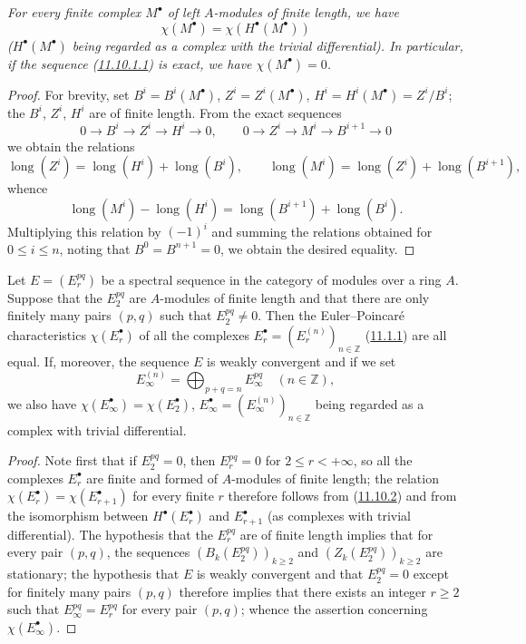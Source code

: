 \begin{proposition}[11.10.2]
\label{0.11.10.2}
\emph{For every finite complex $M^\bullet$ of left $A$-modules of finite
length, we have
\[
\chi(M^\bullet)=\chi(H^\bullet(M^\bullet))
\]
($H^\bullet(M^\bullet)$ being regarded as a complex with the trivial
differential). In particular, if the sequence
(\hyperref[0.11.10.1.1]{11.10.1.1}) is exact, we have
$\chi(M^\bullet)=0$.}
\end{proposition}

\begin{proof}
For brevity, set $B^i=B^i(M^\bullet)$, $Z^i=Z^i(M^\bullet)$,
$H^i=H^i(M^\bullet)=Z^i/B^i$; the $B^i$, $Z^i$, $H^i$ are of finite
length. From the exact sequences
\[
0\longrightarrow B^i\longrightarrow Z^i\longrightarrow H^i
\longrightarrow0,
\qquad
0\longrightarrow Z^i\longrightarrow M^i\longrightarrow B^{i+1}
\longrightarrow0
\]
we obtain the relations
\[
\operatorname{long}(Z^i)=\operatorname{long}(H^i)+
\operatorname{long}(B^i),
\qquad
\operatorname{long}(M^i)=\operatorname{long}(Z^i)+
\operatorname{long}(B^{i+1}),
\]
whence
\[
\operatorname{long}(M^i)-\operatorname{long}(H^i)=
\operatorname{long}(B^{i+1})+\operatorname{long}(B^i).
\]
Multiplying this relation by $(-1)^i$ and summing the relations
obtained for $0\leq i\leq n$, noting that
$B^0=B^{n+1}=0$, we obtain the desired equality.
\end{proof}

\begin{corollary}[11.10.3]
\label{0.11.10.3}
Let $E=(E_r^{pq})$ be a spectral sequence in the category of modules over a
ring $A$. Suppose that the $E_2^{pq}$ are $A$-modules of finite
length and that there are only finitely many pairs $(p,q)$ such that
$E_2^{pq}\neq0$. Then the Euler--Poincaré characteristics
$\chi(E_r^\bullet)$ of all the complexes
$E_r^\bullet=(E_r^{(n)})_{n\in\mathbb Z}$
(\hyperref[0.11.1.1]{11.1.1}) are all equal. If, moreover, the sequence
$E$ is weakly convergent and if we set
\[
E_\infty^{(n)}=\bigoplus_{p+q=n}E_\infty^{pq}\quad(n\in\mathbb Z),
\]
we also have $\chi(E_\infty^\bullet)=\chi(E_2^\bullet)$,
$E_\infty^\bullet=(E_\infty^{(n)})_{n\in\mathbb Z}$ being regarded as
a complex with trivial differential.
\end{corollary}

\begin{proof}
Note first that if $E_2^{pq}=0$, then $E_r^{pq}=0$ for
$2\leq r<+\infty$, so all the complexes $E_r^\bullet$ are finite and
formed of $A$-modules of finite length; the relation
$\chi(E_r^\bullet)=\chi(E_{r+1}^\bullet)$ for every finite $r$ therefore
follows from (\hyperref[0.11.10.2]{11.10.2}) and from the isomorphism
between $H^\bullet(E_r^\bullet)$ and $E_{r+1}^\bullet$ (as complexes with
trivial differential). The hypothesis that the $E_r^{pq}$ are of finite length
implies that for every pair $(p,q)$, the sequences
$(B_k(E_2^{pq}))_{k\geq2}$ and $(Z_k(E_2^{pq}))_{k\geq2}$ are stationary;
the hypothesis that $E$ is weakly convergent and that $E_2^{pq}=0$ except
for finitely many pairs $(p,q)$ therefore implies that there exists an
integer $r\geq2$ such that $E_\infty^{pq}=E_r^{pq}$ for every pair $(p,q)$;
whence the assertion concerning $\chi(E_\infty^\bullet)$.
\end{proof}


